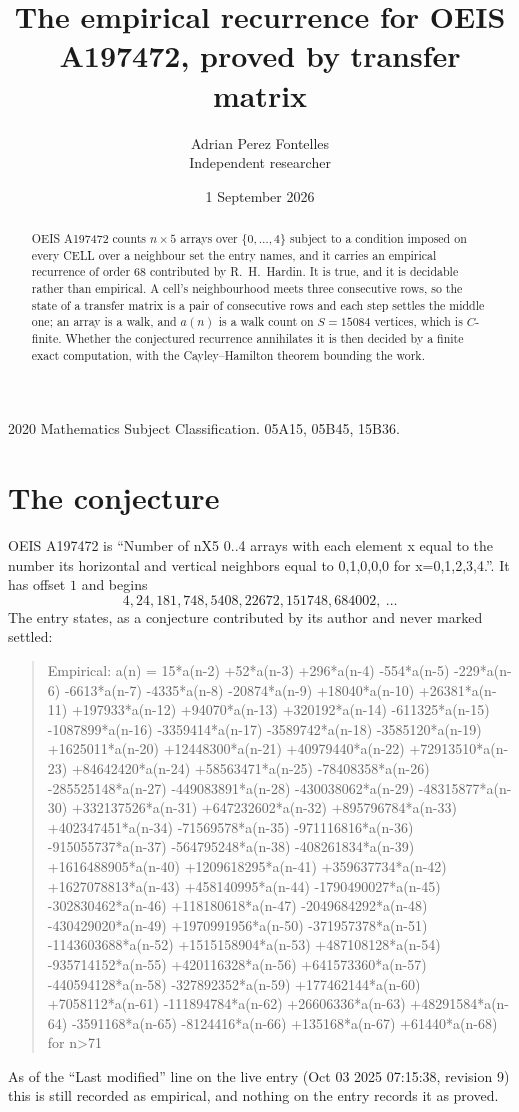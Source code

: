 \documentclass[11pt,a4paper]{article}
\title{The empirical recurrence for OEIS A197472, proved by transfer matrix}
\author{Adrian Perez Fontelles\\ \small Independent researcher}
\date{1 September 2026}
\theoremstyle{plain}
\theoremstyle{definition}
\begin{document}
\maketitle

\begin{abstract}
OEIS A197472 counts $n\times5$ arrays over $\{0,\dots,4\}$ subject to a condition imposed on
every CELL over a neighbour set the entry names, and it carries an empirical recurrence of
order $68$ contributed by R.~H.~Hardin. It is true, and it is decidable rather than
empirical. A cell's neighbourhood meets three consecutive rows, so the state of a transfer
matrix is a pair of consecutive rows and each step settles the middle one; an array is a
walk, and $a(n)$ is a walk count on $S=15084$ vertices, which is $C$-finite. Whether the
conjectured recurrence annihilates it is then decided by a finite exact computation, with the
Cayley--Hamilton theorem bounding the work.
\end{abstract}

\noindent\small 2020 Mathematics Subject Classification. 05A15, 05B45, 15B36.\normalsize

\section{The conjecture}

OEIS A197472 is ``Number of nX5 0..4 arrays with each element x equal to the number its horizontal and vertical neighbors equal to 0,1,0,0,0 for x=0,1,2,3,4.''. It has offset $1$ and begins
\[
4, 24, 181, 748, 5408, 22672, 151748, 684002,\ \dots
\]
The entry states, as a conjecture contributed by its author and never marked settled:
\begin{quote}
Empirical: a(n) = 15*a(n-2) +52*a(n-3) +296*a(n-4) -554*a(n-5) -229*a(n-6) -6613*a(n-7) -4335*a(n-8) -20874*a(n-9) +18040*a(n-10) +26381*a(n-11) +197933*a(n-12) +94070*a(n-13) +320192*a(n-14) -611325*a(n-15) -1087899*a(n-16) -3359414*a(n-17) -3589742*a(n-18) -3585120*a(n-19) +1625011*a(n-20) +12448300*a(n-21) +40979440*a(n-22) +72913510*a(n-23) +84642420*a(n-24) +58563471*a(n-25) -78408358*a(n-26) -285525148*a(n-27) -449083891*a(n-28) -430038062*a(n-29) -48315877*a(n-30) +332137526*a(n-31) +647232602*a(n-32) +895796784*a(n-33) +402347451*a(n-34) -71569578*a(n-35) -971116816*a(n-36) -915055737*a(n-37) -564795248*a(n-38) -408261834*a(n-39) +1616488905*a(n-40) +1209618295*a(n-41) +359637734*a(n-42) +1627078813*a(n-43) +458140995*a(n-44) -1790490027*a(n-45) -302830462*a(n-46) +118180618*a(n-47) -2049684292*a(n-48) -430429020*a(n-49) +1970991956*a(n-50) -371957378*a(n-51) -1143603688*a(n-52) +1515158904*a(n-53) +487108128*a(n-54) -935714152*a(n-55) +420116328*a(n-56) +641573360*a(n-57) -440594128*a(n-58) -327892352*a(n-59) +177462144*a(n-60) +7058112*a(n-61) -111894784*a(n-62) +26606336*a(n-63) +48291584*a(n-64) -3591168*a(n-65) -8124416*a(n-66) +135168*a(n-67) +61440*a(n-68) for n>71
\end{quote}
As of the ``Last modified'' line on the live entry (Oct 03 2025 07:15:38, revision 9) this is still
recorded as empirical, and nothing on the entry records it as proved.
\end{document}
